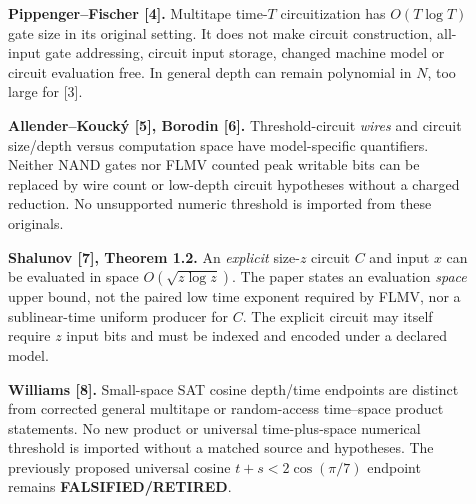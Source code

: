 \documentclass[11pt]{article}
\begin{document}
\begin{description}
\item[] \textbf{Pippenger--Fischer [4].} Multitape time-$T$ circuitization has $O(T\log T)$ gate size in its original setting. It does not make circuit construction, all-input gate addressing, circuit input storage, changed machine model or circuit evaluation free. In general depth can remain polynomial in $N$, too large for [3].
\item[] \textbf{Allender--Kouck\'y [5], Borodin [6].} Threshold-circuit \emph{wires} and circuit size/depth versus computation space have model-specific quantifiers. Neither NAND gates nor FLMV counted peak writable bits can be replaced by wire count or low-depth circuit hypotheses without a charged reduction. No unsupported numeric threshold is imported from these originals.
\item[] \textbf{Shalunov [7], Theorem 1.2.} An \emph{explicit} size-$z$ circuit $C$ and input $x$ can be evaluated in space $O(\sqrt{z\log z})$. The paper states an evaluation \emph{space} upper bound, not the paired low time exponent required by FLMV, nor a sublinear-time uniform producer for $C$. The explicit circuit may itself require $z$ input bits and must be indexed and encoded under a declared model.
\item[] \textbf{Williams [8].} Small-space SAT cosine depth/time endpoints are distinct from corrected general multitape or random-access time--space product statements. No new product or universal time-plus-space numerical threshold is imported without a matched source and hypotheses. The previously proposed universal cosine $t+s<2\cos(\pi/7)$ endpoint remains \textbf{FALSIFIED/RETIRED}.
\end{description}
\end{document}
